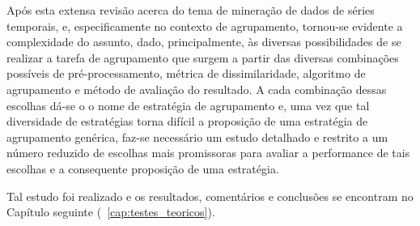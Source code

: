 Após esta extensa revisão acerca do tema de mineração de dados de séries temporais, e, especificamente no contexto de agrupamento, tornou-se evidente a complexidade do assunto, dado, principalmente, às diversas possibilidades de se realizar a tarefa de agrupamento que surgem a partir das diversas combinações possíveis de pré-processamento, métrica de dissimilaridade, algoritmo de agrupamento e método de avaliação do resultado. A cada combinação dessas escolhas dá-se o o nome de estratégia de agrupamento e, uma vez que tal diversidade de estratégias torna difícil a proposição de uma estratégia de agrupamento genérica, faz-se necessário um estudo detalhado e restrito a um número reduzido de escolhas mais promissoras para avaliar a performance de tais escolhas e a consequente proposição de uma estratégia.

Tal estudo foi realizado e os resultados, comentários e conclusões se encontram no Capítulo seguinte (~\ref{cap:testes_teoricos}).
